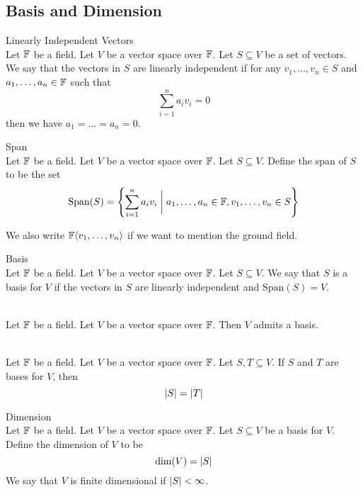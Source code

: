 \documentclass[a4paper]{article}
\begin{document}
\subsection{Basis and Dimension}
\begin{defn}{Linearly Independent Vectors}{}\\
Let $\mathbb{F}$ be a field. Let $V$ be a vector space over $\mathbb{F}$. Let $S\subseteq V$ be a set of vectors. We say that the vectors in $S$ are linearly independent if for any $v_1,\dots,v_n\in S$ and $a_1,\dots,a_n\in\mathbb{F}$ such that $$\sum_{i=1}^na_iv_i=0$$ then we have $a_1=\dots=a_n=0$. 
\end{defn}

\begin{defn}{Span}{}\\
Let $\mathbb{F}$ be a field. Let $V$ be a vector space over $\mathbb{F}$. Let $S\subseteq V$. Define the span of $S$ to be the set $$\text{Span}(S)=\left\{\sum_{i=1}^na_iv_i\;\bigg{|}\;a_1,\dots,a_n\in\mathbb{F}, v_1,\dots,v_n\in S\right\}$$
\end{defn}

We also write $\mathbb{F}\langle v_1,\dots,v_n\rangle$ if we want to mention the ground field. 

\begin{defn}{Basis}{}\\
Let $\mathbb{F}$ be a field. Let $V$ be a vector space over $\mathbb{F}$. Let $S\subseteq V$. We say that $S$ is a basis for $V$ if the vectors in $S$ are linearly independent and $\text{Span}(S)=V$. 
\end{defn}

\begin{lmm}{}{}\\
Let $\mathbb{F}$ be a field. Let $V$ be a vector space over $\mathbb{F}$. Then $V$ admits a basis. 
\end{lmm}

\begin{lmm}{}{}\\
Let $\mathbb{F}$ be a field. Let $V$ be a vector space over $\mathbb{F}$. Let $S,T\subseteq V$. If $S$ and $T$ are bases for $V$, then $$\abs{S}=\abs{T}$$
\end{lmm}

\begin{defn}{Dimension}{}\\
Let $\mathbb{F}$ be a field. Let $V$ be a vector space over $\mathbb{F}$. Let $S\subseteq V$ be a basis for $V$. Define the dimension of $V$ to be $$\dim(V)=\abs{S}$$ We say that $V$ is finite dimensional if $\abs{S}<\infty$. 
\end{defn}
\end{document}
